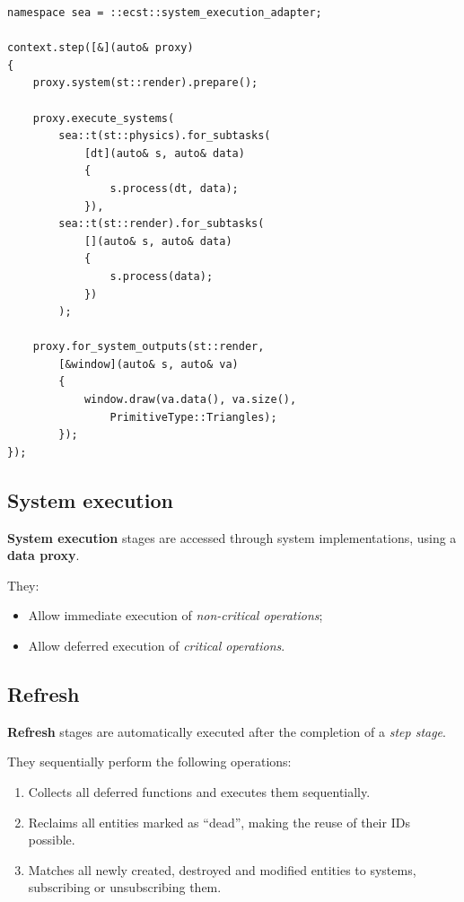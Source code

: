 \documentclass[twoside, 12pt, a4paper, openany]{book}
\begin{document}
\begin{verbatim}
namespace sea = ::ecst::system_execution_adapter;

context.step([&](auto& proxy)
{
    proxy.system(st::render).prepare();

    proxy.execute_systems(
        sea::t(st::physics).for_subtasks(
            [dt](auto& s, auto& data)
            {
                s.process(dt, data);
            }),
        sea::t(st::render).for_subtasks(
            [](auto& s, auto& data)
            {
                s.process(data);
            })
        );

    proxy.for_system_outputs(st::render,
        [&window](auto& s, auto& va)
        {
            window.draw(va.data(), va.size(),
                PrimitiveType::Triangles);
        });
});
\end{verbatim}

\subsection{System execution}\label{system-execution}

\textbf{System execution} stages are accessed through system
implementations, using a \textbf{data proxy}.

They:

\begin{itemize}
\item
  Allow immediate execution of \emph{non-critical operations};
\item
  Allow deferred execution of \emph{critical operations}.
\end{itemize}

\hypertarget{flow_refresh}{\subsection{Refresh}\label{flow_refresh}}

\textbf{Refresh} stages are automatically executed after the completion
of a \emph{step stage}.

They sequentially perform the following operations:

\begin{enumerate}
\def\labelenumi{\arabic{enumi}.}
\item
  Collects all deferred functions and executes them sequentially.
\item
  Reclaims all entities marked as ``dead'', making the reuse of their
  IDs possible.
\item
  Matches all newly created, destroyed and modified entities to systems,
  subscribing or unsubscribing them.
\end{enumerate}
\end{document}
